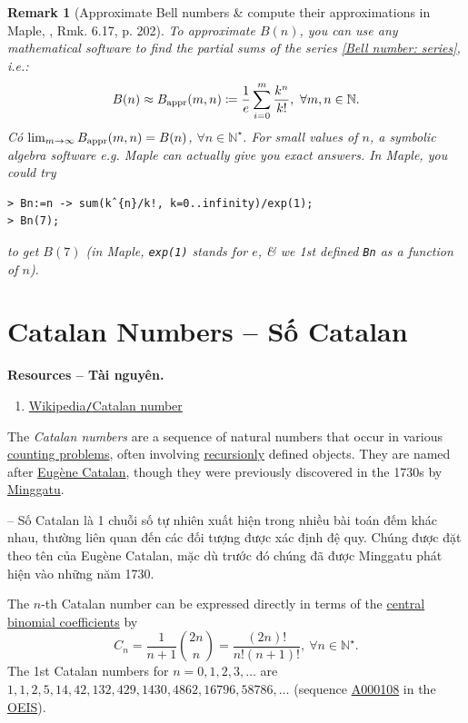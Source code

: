 \documentclass[oneside]{book}
\newtheorem{remark}{Remark}
\begin{document}
\begin{remark}[Approximate Bell numbers \& compute their approximations in Maple, \cite{Shahriari2022}, Rmk. 6.17, p. 202]
	To approximate $B(n)$, you can use any mathematical software to find the partial sums of the series \eqref{Bell number: series}, i.e.:
	\begin{equation*}
		B(n)\approx B_{\rm appr}(m,n)\coloneqq\frac{1}{e}\sum_{i=0}^m \frac{k^n}{k!},\ \forall m,n\in\mathbb{N}.
	\end{equation*}
	Có $\lim_{m\to\infty} B_{\rm appr}(m,n) = B(n)$, $\forall n\in\mathbb{N}^\star$. For small values of $n$, a symbolic algebra software e.g. Maple can actually give you exact answers. In Maple, you could try
	\begin{verbatim}
> Bn:=n -> sum(kˆ{n}/k!, k=0..infinity)/exp(1);
> Bn(7);
	\end{verbatim}
	to get $B(7)$ (in Maple, {\tt exp(1)} stands for $e$, \& we 1st defined {\tt Bn} as a function of $n$).
\end{remark}


\section{Catalan Numbers -- Số Catalan}
\textbf{\textsf{Resources -- Tài nguyên.}}
\begin{enumerate}
	\item \href{https://en.wikipedia.org/wiki/Catalan_number}{Wikipedia{\tt/}Catalan number}
\end{enumerate}
The {\it Catalan numbers} are a sequence of natural numbers that occur in various \href{https://en.wikipedia.org/wiki/Enumeration}{counting problems}, often involving \href{https://en.wikipedia.org/wiki/Recursion}{recursionly} defined objects. They are named after \href{https://en.wikipedia.org/wiki/Eug%C3%A8ne_Charles_Catalan}{Eug\`ene Catalan}, though they were previously discovered in the 1730s by \href{https://en.wikipedia.org/wiki/Minggatu}{\sc Minggatu}.

-- Số Catalan là 1 chuỗi số tự nhiên xuất hiện trong nhiều bài toán đếm khác nhau, thường liên quan đến các đối tượng được xác định đệ quy. Chúng được đặt theo tên của {\sc Eugène Catalan}, mặc dù trước đó chúng đã được {\sc Minggatu} phát hiện vào những năm 1730.

The $n$-th Catalan number can be expressed directly in terms of the \href{https://en.wikipedia.org/wiki/Central_binomial_coefficient}{central binomial coefficients} by
\begin{equation}
	\label{Catalan number}
	C_n = \frac{1}{n + 1}\binom{2n}{n} = \frac{(2n)!}{n!(n + 1)!},\ \forall n\in\mathbb{N}^\star.
\end{equation}
The 1st Catalan numbers for $n = 0,1,2,3,\ldots$ are $1, 1, 2, 5, 14, 42, 132, 429, 1430, 4862, 16796, 58786,\ldots$ (sequence \href{https://oeis.org/A000108}{A000108} in the \href{https://en.wikipedia.org/wiki/On-Line_Encyclopedia_of_Integer_Sequences}{OEIS}).
\end{document}
